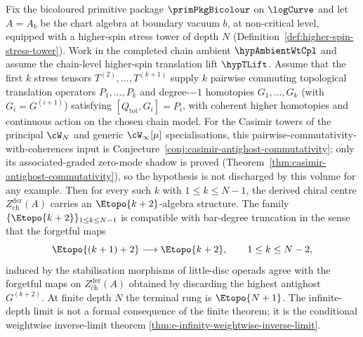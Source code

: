 \begin{theorem}
\label{thm:e-infinity-topologization-ladder}
Fix the bicoloured primitive package $\primPkgBicolour$ on $\logCurve$
and let $A = A_b$ be the chart algebra at boundary vacuum $b$, at
non-critical level, equipped with a higher-spin stress tower of depth $N$
\textup{(}Definition~\textup{\ref{def:higher-spin-stress-tower}}\textup{)}.
Work in the completed chain ambient \(\hypAmbientWtCpl\) and assume the
chain-level higher-spin translation lift \(\hypTLift\).
Assume that the first $k$ stress tensors
$T^{(2)},\ldots,T^{(k+1)}$ supply $k$ pairwise commuting
topological translation operators $P_1,\ldots,P_k$ and degree-$-1$
homotopies $G_1,\ldots,G_k$ (with $G_i=G^{(i+1)}$) satisfying
$[Q_{\mathrm{tot}},G_i]=P_i$, with coherent higher homotopies and
continuous action on the chosen chain model. For the Casimir towers
of the principal $\cW_N$ and generic $\cW_\infty[\mu]$
specialisations, this pairwise-commutativity-with-coherences input
is Conjecture~\ref{conj:casimir-antighost-commutativity}; only its
associated-graded zero-mode shadow is proved
(Theorem~\ref{thm:casimir-antighost-commutativity}), so the
hypothesis is not discharged by this volume for any example. Then for every such $k$
with $1 \le k \le N-1$, the derived chiral centre
$Z^{\mathrm{der}}_{\mathrm{ch}}(A)$ carries an $\Etopo{k+2}$-algebra
structure. The family $\{\Etopo{k+2}\}_{1 \le k \le N-1}$ is compatible
with bar-degree truncation in the sense that the forgetful maps
\begin{equation}\label{eq:e-ladder-compat}
\Etopo{(k+1)+2} \longrightarrow \Etopo{k+2},\qquad
1 \le k \le N-2,
\end{equation}
induced by the stabilisation morphisms of little-disc operads agree with
the forgetful maps on $Z^{\mathrm{der}}_{\mathrm{ch}}(A)$ obtained by
discarding the highest antighost $G^{(k+2)}$. At finite depth \(N\) the
terminal rung is \(\Etopo{N+1}\). The infinite-depth limit is not a
formal consequence of the finite theorem; it is the conditional
weightwise inverse-limit theorem
\textup{\ref{thm:e-infinity-weightwise-inverse-limit}}.
\end{theorem}

